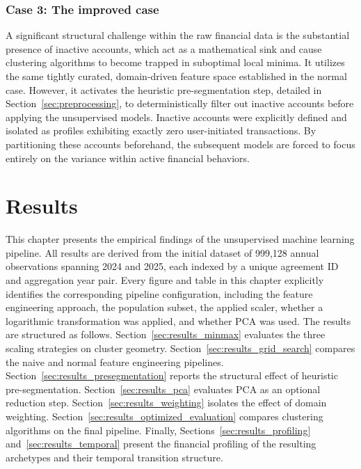         \subsection{Case 3: The improved case}
        A significant structural challenge within the raw financial data is the substantial presence of inactive accounts, which act as a mathematical sink and cause clustering algorithms to become trapped in suboptimal local minima. It utilizes the same tightly curated, domain-driven feature space established in the normal case.
        However, it activates the heuristic pre-segmentation step, detailed in Section~\ref{sec:preprocessing}, to deterministically filter out inactive accounts before applying the unsupervised models.
        Inactive accounts were explicitly defined and isolated as profiles exhibiting exactly zero user-initiated transactions.
        By partitioning these accounts beforehand, the subsequent models are forced to focus entirely on the variance within active financial behaviors.


\chapter{Results}
\label{chap:Results}

This chapter presents the empirical findings of the unsupervised machine learning pipeline.
All results are derived from the initial dataset of 999,128 annual observations spanning 2024 and 2025, each indexed by a unique agreement ID and aggregation year pair.
Every figure and table in this chapter explicitly identifies the corresponding pipeline configuration, including the feature engineering approach, the population subset, the applied scaler, whether a logarithmic transformation was applied, and whether PCA was used.
The results are structured as follows. Section~\ref{sec:results_minmax} evaluates the three scaling strategies on cluster geometry.
Section~\ref{sec:results_grid_search} compares the naive and normal feature engineering pipelines. Section~\ref{sec:results_presegmentation} reports the structural effect of heuristic pre-segmentation.
Section~\ref{sec:results_pca} evaluates PCA as an optional reduction step. Section~\ref{sec:results_weighting} isolates the effect of domain weighting.
Section~\ref{sec:results_optimized_evaluation} compares clustering algorithms on the final pipeline. Finally, Sections~\ref{sec:results_profiling} and~\ref{sec:results_temporal} present the financial profiling of the resulting archetypes and their temporal transition structure.
    
